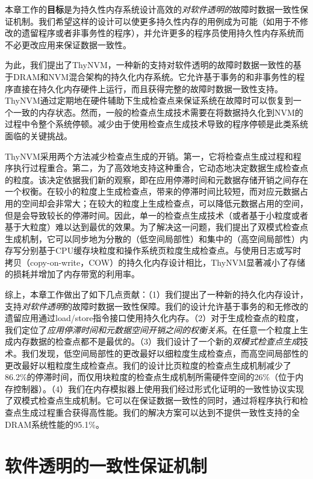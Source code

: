 本章工作的\textbf{目标}是为持久性内存系统设计高效的\emph{对软件透明的}故障时数据一致性保证机制。我们希望这样的设计可以使更多持久性内存的用例成为可能（如用于不修改的遗留程序或者非事务性的程序），并允许更多的程序员使用持久性内存系统而不必更改应用来保证数据一致性。

为此，我们提出了ThyNVM，一种新的支持对软件透明的故障时数据一致性的基于DRAM和NVM混合架构的持久化内存系统。它允许基于事务的和非事务性的程序直接在持久化内存硬件上运行，而且获得完整的故障时数据一致性支持。ThyNVM通过定期地在硬件辅助下生成检查点来保证系统在故障时可以恢复到一个一致的内存状态。然而，一般的检查点生成技术需要在将数据持久化到NVM的过程中令整个系统停顿。减少由于使用检查点生成技术导致的程序停顿是此类系统面临的关键挑战。

ThyNVM采用两个方法减少检查点生成的开销。第一，它将检查点生成过程和程序执行过程重合。第二，为了高效地支持这种重合，它动态地决定数据生成检查点的粒度。该决定依据我们新的观察，即在应用停滞时间和元数据存储开销之间存在一个权衡。在较小的粒度上生成检查点，带来的停滞时间比较短，而对应元数据占用的空间却会非常大；在较大的粒度上生成检查点，可以降低元数据占用的空间，但是会导致较长的停滞时间。因此，单一的检查点生成技术（或者基于小粒度或者基于大粒度）难以达到最优的效果。为了解决这一问题，我们提出了双模式检查点生成机制，它可以同步地为分散的（低空间局部性）和集中的（高空间局部性）内存写分别基于CPU缓存块粒度和操作系统页粒度生成检查点。与使用日志\cite{Volos:2011:MLP:1950365.1950379, Coburn:2011:NMP:1950365.1950380}或写时拷贝（copy-on-write，COW）\cite{Condit:2009:BIT:1629575.1629589, Venkataraman:2011:CDD:1960475.1960480}的持久化内存设计相比，ThyNVM显著减小了存储的损耗并增加了内存带宽的利用率。

综上，本章工作做出了如下几点贡献：（1）我们提出了一种新的持久化内存设计，支持\emph{对软件透明}的故障时数据一致性保障。我们的设计允许基于事务的和无修改的遗留应用通过load/store指令接口使用持久化内存。（2）对于生成检查点的粒度，我们定位了\emph{应用停滞时间和元数据空间开销之间的权衡关系}。在任意一个粒度上生成内存数据的检查点都不是最优的。（3）我们设计了一个新的\emph{双模式检查点生成}技术。我们发现，低空间局部性的更改最好以细粒度生成检查点，而高空间局部性的更改最好以粗粒度生成检查点。我们的设计比页粒度的检查点生成机制减少了86.2\%的停滞时间，而仅用块粒度的检查点生成机制所需硬件空间的26\%（位于内存控制器）。（4）我们在内存模拟器上使用我们经过形式化证明的一致性协议实现了双模式检查点生成机制。它可以在保证数据一致性的同时，通过将程序执行和检查点生成过程重合获得高性能。我们的解决方案可以达到不提供一致性支持的全DRAM系统性能的95.1\%。

\section{软件透明的一致性保证机制}

